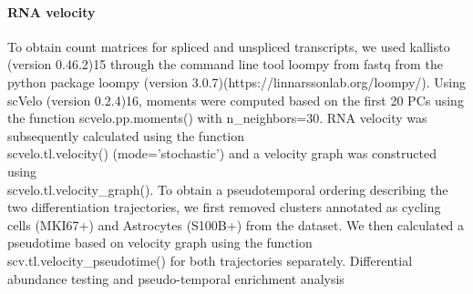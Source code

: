 \paragraph{RNA velocity}
To obtain count matrices for spliced and unspliced transcripts, we used kallisto (version 0.46.2)15 through the command line tool loompy from fastq from the python package loompy (version 3.0.7)(https://linnarssonlab.org/loompy/). Using scVelo (version 0.2.4)16, moments were computed based on the first 20 PCs using the function scvelo.pp.moments() with n\_neighbors=30. RNA velocity was subsequently calculated using the function \\ scvelo.tl.velocity() (mode='stochastic') and a velocity graph was constructed using \\ scvelo.tl.velocity\_graph(). To obtain a pseudotemporal ordering describing the two differentiation trajectories, we first removed clusters annotated as cycling cells (MKI67+) and Astrocytes (S100B+) from the dataset. We then calculated a pseudotime based on velocity graph using the function scv.tl.velocity\_pseudotime() for both trajectories separately.
Differential abundance testing and pseudo-temporal enrichment analysis
